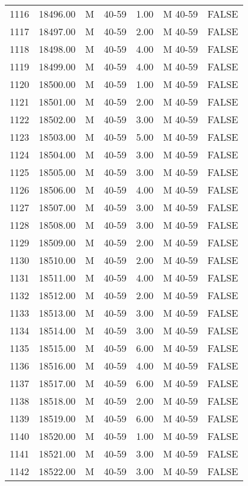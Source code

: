 \begin{table}[ht]
\begin{tabular}{rrllrll}
  1116 & 18496.00 & M & 40-59 & 1.00 & M 40-59 & FALSE \\ 
  1117 & 18497.00 & M & 40-59 & 2.00 & M 40-59 & FALSE \\ 
  1118 & 18498.00 & M & 40-59 & 4.00 & M 40-59 & FALSE \\ 
  1119 & 18499.00 & M & 40-59 & 4.00 & M 40-59 & FALSE \\ 
  1120 & 18500.00 & M & 40-59 & 1.00 & M 40-59 & FALSE \\ 
  1121 & 18501.00 & M & 40-59 & 2.00 & M 40-59 & FALSE \\ 
  1122 & 18502.00 & M & 40-59 & 3.00 & M 40-59 & FALSE \\ 
  1123 & 18503.00 & M & 40-59 & 5.00 & M 40-59 & FALSE \\ 
  1124 & 18504.00 & M & 40-59 & 3.00 & M 40-59 & FALSE \\ 
  1125 & 18505.00 & M & 40-59 & 3.00 & M 40-59 & FALSE \\ 
  1126 & 18506.00 & M & 40-59 & 4.00 & M 40-59 & FALSE \\ 
  1127 & 18507.00 & M & 40-59 & 3.00 & M 40-59 & FALSE \\ 
  1128 & 18508.00 & M & 40-59 & 3.00 & M 40-59 & FALSE \\ 
  1129 & 18509.00 & M & 40-59 & 2.00 & M 40-59 & FALSE \\ 
  1130 & 18510.00 & M & 40-59 & 2.00 & M 40-59 & FALSE \\ 
  1131 & 18511.00 & M & 40-59 & 4.00 & M 40-59 & FALSE \\ 
  1132 & 18512.00 & M & 40-59 & 2.00 & M 40-59 & FALSE \\ 
  1133 & 18513.00 & M & 40-59 & 3.00 & M 40-59 & FALSE \\ 
  1134 & 18514.00 & M & 40-59 & 3.00 & M 40-59 & FALSE \\ 
  1135 & 18515.00 & M & 40-59 & 6.00 & M 40-59 & FALSE \\ 
  1136 & 18516.00 & M & 40-59 & 4.00 & M 40-59 & FALSE \\ 
  1137 & 18517.00 & M & 40-59 & 6.00 & M 40-59 & FALSE \\ 
  1138 & 18518.00 & M & 40-59 & 2.00 & M 40-59 & FALSE \\ 
  1139 & 18519.00 & M & 40-59 & 6.00 & M 40-59 & FALSE \\ 
  1140 & 18520.00 & M & 40-59 & 1.00 & M 40-59 & FALSE \\ 
  1141 & 18521.00 & M & 40-59 & 3.00 & M 40-59 & FALSE \\ 
  1142 & 18522.00 & M & 40-59 & 3.00 & M 40-59 & FALSE \\ 

\end{tabular}
\end{table}
